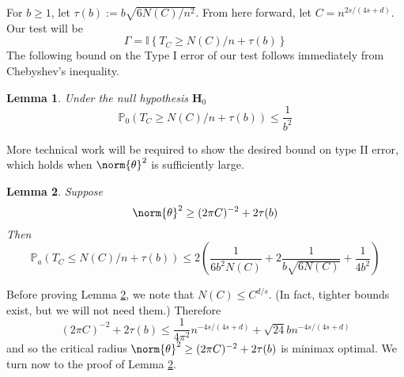 \documentclass{article}
\newcommand{\set}[1]{\left\{#1\right\}}
\newcommand{\1}{\mathbb{I}}
\newcommand{\Pbb}{\mathbb{P}}
\theoremstyle{alden}
\theoremstyle{aldenthm}
\newtheorem{lemma}{Lemma}
\theoremstyle{definition}
\theoremstyle{remark}
\begin{document}
For $b \geq 1$, let $\tau(b) := b \sqrt{6N(C)/n^2}$. From here forward, let $C = n^{2s/(4s + d)}$. Our test will be
\begin{equation*}
\Gamma = \1\set{T_C \geq N(C)/n + \tau(b)}
\end{equation*}
The following bound on the Type I error of our test follows immediately from Chebyshev's inequality.
\begin{lemma}
	Under the null hypothesis $\mathbf{H}_0$
	\begin{equation*}
	\Pbb_0(T_C \geq N(C)/n + \tau(b)) \leq \frac{1}{b^2}
	\end{equation*}
\end{lemma}

More technical work will be required to show the desired bound on type II error, which holds when $\norm{\theta}^2$ is sufficiently large.
\begin{lemma}
	\label{lem: type_2_error}
	Suppose
	\begin{equation*}
	\norm{\theta}^2 \geq (2\pi C)^{-2} + 2\tau(b)
	\end{equation*}
	Then
	\begin{equation*}
	\Pbb_{a}(T_C \leq N(C)/n + \tau(b)) \leq 2 \left(\frac{1}{6b^2N(C)} + 2\frac{1}{b\sqrt{6N(C)}} +  \frac{1}{4b^2}\right)
	\end{equation*}
\end{lemma}
Before proving Lemma \ref{lem: type_2_error}, we note that $N(C) \leq C^{d/s}$. (In fact, tighter bounds exist, but we will not need them.) Therefore
\begin{equation*}
(2\pi C)^{-2} + 2\tau(b) \leq \frac{1}{4\pi^2}n^{-4s/(4s + d)} + \sqrt{24}bn^{-4s/(4s + d)}
\end{equation*}
and so the critical radius $\norm{\theta}^2 \geq (2\pi C)^{-2} + 2\tau(b)$ is minimax optimal. We turn now to the proof of Lemma \ref{lem: type_2_error}.
\end{document}

